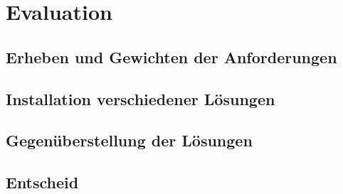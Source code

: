 
\section{Evaluation}

\subsection{Erheben und Gewichten der Anforderungen}




\subsection{Installation verschiedener Lösungen}






\subsection{Gegenüberstellung der Lösungen}



\subsection{Entscheid}
